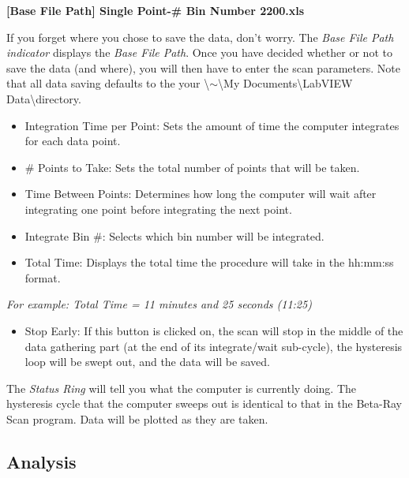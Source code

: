 \documentclass{../lab}
\begin{document}
\textbf{[Base File Path] Single Point-\# Bin Number 2200.xls}

If you forget where you chose to save the data, don't worry. The \emph{Base File Path indicator} displays the \emph{Base File Path}. Once you have decided whether or not to save the data (and where), you will then have to enter the scan parameters. Note that all data saving defaults to the your \textbackslash$\sim$\textbackslash My Documents\textbackslash LabVIEW Data\textbackslash directory.

\begin{itemize}
    \item Integration Time per Point: Sets the amount of time the computer integrates for each data point.

    \item \# Points to Take: Sets the total number of points that will be taken.

    \item Time Between Points: Determines how long the computer will wait after integrating one point before integrating the next point.

    \item Integrate Bin \#: Selects which bin number will be integrated.

    \item Total Time: Displays the total time the procedure will take in the hh:mm:ss format.

\end{itemize}

\emph{For example: Total Time = 11 minutes and 25 seconds (11:25)}

\begin{itemize}
    \item Stop Early: If this button is clicked on, the scan will stop in the middle of the data gathering part (at the end of its integrate/wait sub-cycle), the hysteresis loop will be swept out, and the data will be saved.

\end{itemize}

The \emph{Status Ring} will tell you what the computer is currently doing. The hysteresis cycle that the computer sweeps out is identical to that in the Beta-Ray Scan program. Data will be plotted as they are taken.

\subsection{Analysis}
\end{document}

